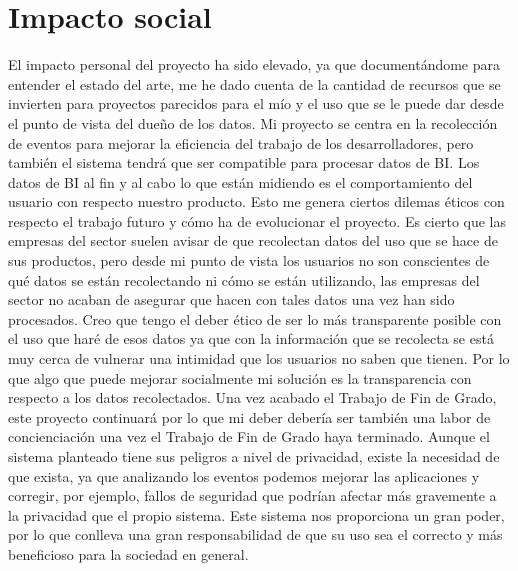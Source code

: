 \section{Impacto social}\label{sec:imsoc}
El impacto personal del proyecto ha sido elevado, ya que documentándome para entender el estado del arte, me he dado cuenta de la cantidad de recursos que se invierten para proyectos parecidos para el mío y el uso que se le puede dar desde el punto de vista del dueño de los datos. Mi proyecto se centra en la recolección de eventos para mejorar la eficiencia del trabajo de los desarrolladores, pero también el sistema tendrá que ser compatible para procesar datos de BI.
Los datos de BI al fin y al cabo lo que están midiendo es el comportamiento del usuario con respecto nuestro producto. Esto me genera ciertos dilemas éticos con respecto el trabajo futuro y cómo ha de evolucionar el proyecto. Es cierto que las empresas del sector suelen avisar de que recolectan datos del uso que se hace de sus productos, pero desde mi punto de vista los usuarios no son conscientes de qué datos se están recolectando ni cómo se están utilizando, las empresas del sector no acaban de asegurar que hacen con tales datos una vez han sido procesados.
Creo que tengo el deber ético de ser lo más transparente posible con el uso que haré de esos datos ya que con la información que se recolecta se está muy cerca de vulnerar una intimidad que los usuarios no saben que tienen. Por lo que algo que puede mejorar socialmente mi solución es la transparencia con respecto a los datos recolectados. Una vez acabado el Trabajo de Fin de Grado, este proyecto continuará por lo que mi deber debería ser también una labor de concienciación una vez el Trabajo de Fin de Grado haya terminado.
Aunque el sistema planteado tiene sus peligros a nivel de privacidad, existe la necesidad de que exista, ya que analizando los eventos podemos mejorar las aplicaciones y corregir, por ejemplo, fallos de seguridad que podrían afectar más gravemente a la privacidad que el propio sistema. Este sistema nos proporciona un gran poder, por lo que conlleva una gran responsabilidad de que su uso sea el correcto y más beneficioso para la sociedad en general.


